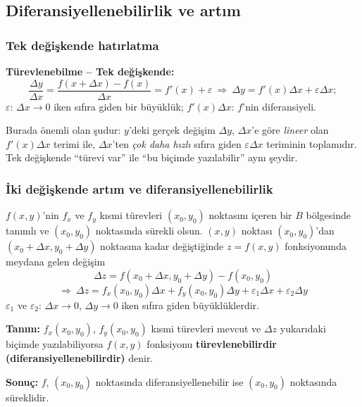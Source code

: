 \subsection{Diferansiyellenebilirlik ve artım}

\subsubsection{Tek değişkende hatırlatma}

\begin{tahta}
\textbf{Türevlenebilme -- Tek değişkende:}
\[
\frac{\Delta y}{\Delta x}=\frac{f(x+\Delta x)-f(x)}{\Delta x}=f'(x)+\varepsilon
\ \Rightarrow\ \Delta y=f'(x)\Delta x+\varepsilon\Delta x ;
\]
$\varepsilon$: $\Delta x\to0$ iken sıfıra giden bir büyüklük; $f'(x)\Delta x$: $f$'nin diferansiyeli.
\end{tahta}

Burada önemli olan şudur: $y$'deki gerçek değişim $\Delta y$, $\Delta x$'e göre \emph{lineer} olan $f'(x)\Delta x$ terimi
ile, $\Delta x$'ten \emph{çok daha hızlı} sıfıra giden $\varepsilon\Delta x$ teriminin toplamıdır. Tek değişkende
``türevi var'' ile ``bu biçimde yazılabilir'' aynı şeydir.

\subsubsection{İki değişkende artım ve diferansiyellenebilirlik}

\begin{tahta}
$f(x,y)$'nin $f_x$ ve $f_y$ kısmi türevleri $(x_0,y_0)$ noktasını içeren bir $B$ bölgesinde tanımlı ve $(x_0,y_0)$
noktasında sürekli olsun. $(x,y)$ noktası $(x_0,y_0)$'dan $(x_0+\Delta x,y_0+\Delta y)$ noktasına kadar değiştiğinde
$z=f(x,y)$ fonksiyonunda meydana gelen değişim
\[ \Delta z=f(x_0+\Delta x,y_0+\Delta y)-f(x_0,y_0) \]
\[ \Rightarrow\ \Delta z=f_x(x_0,y_0)\Delta x+f_y(x_0,y_0)\Delta y+\varepsilon_1\Delta x+\varepsilon_2\Delta y \]
$\varepsilon_1$ ve $\varepsilon_2$: $\Delta x\to0$, $\Delta y\to0$ iken sıfıra giden büyüklüklerdir.

\textbf{Tanım:} $f_x(x_0,y_0)$, $f_y(x_0,y_0)$ kısmi türevleri mevcut ve $\Delta z$ yukarıdaki biçimde yazılabiliyorsa
$f(x,y)$ fonksiyonu \textbf{türevlenebilirdir (diferansiyellenebilirdir)} denir.

\textbf{Sonuç:} $f$, $(x_0,y_0)$ noktasında diferansiyellenebilir ise $(x_0,y_0)$ noktasında süreklidir.
\end{tahta}

